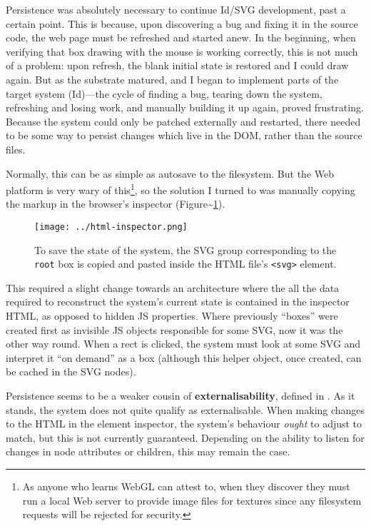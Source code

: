 Persistence was absolutely necessary to continue Id{}/SVG development,
past a certain point. This is because, upon discovering a bug and fixing
it in the source code, the web page must be refreshed and started anew.
In the beginning, when verifying that box drawing with the mouse is
working correctly, this is not much of a problem: upon refresh, the
blank initial state is restored and I could draw again. But as the
substrate matured, and I began to implement parts of the target system
(Id{})---the cycle of finding a bug, tearing down the system, refreshing
and losing work, and manually building it up again, proved frustrating.
Because the system could only be patched externally and restarted, there
needed to be some way to persist changes which live in the DOM, rather
than the source files.

Normally, this can be as simple as autosave to the filesystem. But the
Web platform is very wary of this\footnote{As anyone who learns WebGL
  can attest to, when they discover they must run a local Web server to
  provide image files for textures since any filesystem requests will be
  rejected for security.}, so the solution I turned to was manually
copying the markup in the browser's inspector
(Figure\textasciitilde{}\ref{fig:html-inspector}).

\begin{figure}[h]
  \centering
  \texttt{[image: ../html-inspector.png]}
  \caption{To save the state of the system, the SVG group corresponding to the \texttt{root} box is copied and pasted inside the HTML file's \texttt{\textless{}svg\textgreater{}} element.\label{fig:html-inspector}}
\end{figure}

This required a slight change towards an architecture where the all the
data required to reconstruct the system's current state is contained in
the inspector HTML, as opposed to hidden JS properties. Where previously
``boxes'' were created first as invisible JS objects responsible for
some SVG, now it was the other way round. When a rect is clicked, the
system must look at some SVG and interpret it ``on demand'' as a box
(although this helper object, once created, can be cached in the SVG
nodes).

Persistence seems to be a weaker cousin of \textbf{externalisability},
defined in \cite{externalise}. As it stands, the system does not quite
qualify as externalisable. When making changes to the HTML in the
element inspector, the system's behaviour \emph{ought} to adjust to
match, but this is not currently guaranteed. Depending on the ability to
listen for changes in node attributes or children, this may remain the
case.

